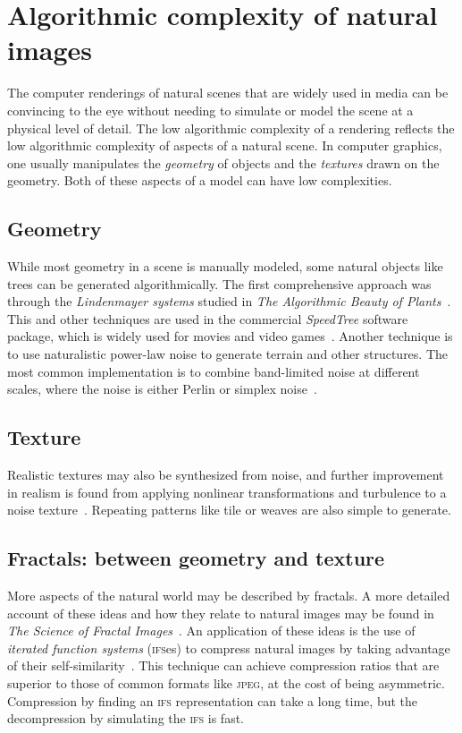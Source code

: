 \documentclass[aps,reprint,floatfix]{revtex4-2}
\theoremstyle{plain}
\theoremstyle{definition}
\begin{document}
\section{Algorithmic complexity of natural images}\label{sec:graphics}

The computer renderings of natural scenes that are widely used in media can be
convincing to the eye without needing to simulate or model the scene at a
physical level of detail. The low algorithmic complexity of a rendering
reflects the low algorithmic complexity of aspects of a natural scene. In
computer graphics, one usually manipulates the \emph{geometry} of objects and
the \emph{textures} drawn on the geometry. Both of these aspects of a model can
have low complexities.

\subsection{Geometry}

While most geometry in a scene is manually modeled, some natural objects like
trees can be generated algorithmically. The first comprehensive approach was
through the \emph{Lindenmayer systems} studied in \textit{The Algorithmic Beauty
of Plants}~\cite{lindenmayer}. This and other techniques are used in the
commercial \emph{SpeedTree} software package, which is widely used for movies
and video games~\cite{speedtree}. Another technique is to use naturalistic
power-law noise to generate terrain and other structures. The most common
implementation is to combine band-limited noise at different scales, where the
noise is either Perlin or simplex noise~\cite{perlin}.

\subsection{Texture}

Realistic textures may also be synthesized from noise, and further improvement
in realism is found from applying nonlinear transformations and turbulence to a
noise texture~\cite{perlin, hypertexture}. Repeating patterns like tile or
weaves are also simple to generate.

\subsection{Fractals: between geometry and texture}

More aspects of the natural world may be described by fractals. A more detailed
account of these ideas and how they relate to natural images may be found in
\textit{The Science of Fractal Images}~\cite{scifract}. An application of these
ideas is the use of \emph{iterated function systems} (\textsc{ifs}es) to
compress natural images by taking advantage of their
self-similarity~\cite[p.~228]{scifract}. This technique can achieve compression
ratios that are superior to those of common formats like \textsc{jpeg}, at the
cost of being asymmetric. Compression by finding an \textsc{ifs} representation
can take a long time, but the decompression by simulating the \textsc{ifs} is
fast.
\end{document}
